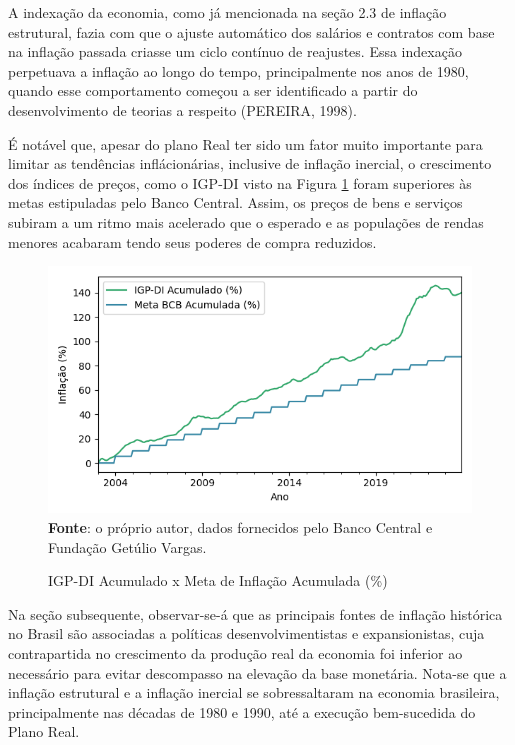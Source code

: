 \documentclass[12pt,oneside,a4paper,chapter=TITLE,english,brazil,sumario=abnt-6027-2012]{abntex2}
\begin{document}
A indexação da economia, como já mencionada na seção 2.3 de inflação estrutural, fazia com que o ajuste automático dos salários e contratos com base na inflação passada criasse um ciclo contínuo de reajustes. Essa indexação perpetuava a inflação ao longo do tempo, principalmente nos anos de 1980, quando esse comportamento começou a ser identificado a partir do desenvolvimento de teorias a respeito (PEREIRA, 1998).

É notável que, apesar do plano Real ter sido um fator muito importante para limitar as tendências inflácionárias, inclusive de inflação	inercial, o crescimento dos índices de preços, como o IGP-DI visto na Figura \ref{fig:igpdiacum} foram superiores às metas estipuladas pelo Banco Central. Assim, os preços de bens e serviços subiram a um ritmo mais acelerado que o esperado e as populações de rendas menores acabaram tendo seus poderes de compra reduzidos.

\begin{figure}[H]
	
	\caption{IGP-DI Acumulado x Meta de Inflação Acumulada (\%)}
	
	\includegraphics[]{fig/igpdi_96_24_t.png}\\
	\footnotesize{\textbf{Fonte}: o próprio autor, dados fornecidos pelo Banco Central e Fundação Getúlio Vargas.}
	\label{fig:igpdiacum}
\end{figure}

Na seção subsequente, observar-se-á que as principais fontes de inflação histórica no Brasil são associadas a políticas desenvolvimentistas e expansionistas, cuja contrapartida no crescimento da produção real da economia foi inferior ao necessário para evitar descompasso na elevação da base monetária. Nota-se que a inflação estrutural e a inflação inercial se sobressaltaram na economia brasileira, principalmente nas décadas de 1980 e 1990, até a execução bem-sucedida do Plano Real.
\end{document}
